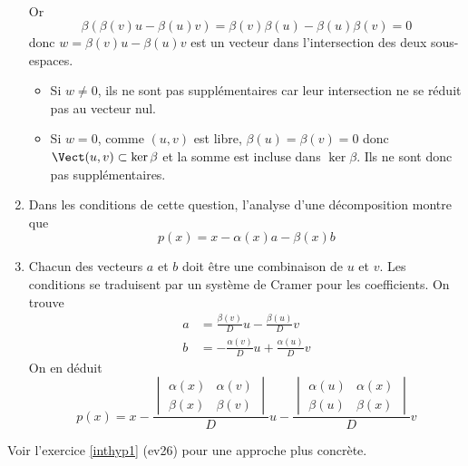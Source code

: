 \begin{enumerate}
\begin{multline*}
\end{multline*}
Or
\begin{displaymath}
  \beta\left( \beta(v)u-\beta(u)v\right) = \beta(v)\beta(u)-\beta(u)\beta(v)=0 
\end{displaymath}
donc $w=\beta(v)u-\beta(u)v$ est un vecteur dans l'intersection des deux sous-espaces.
\begin{itemize}
  \item Si $w\neq 0$, ils ne sont pas supplémentaires car leur intersection ne se réduit pas au vecteur nul.
  \item Si $w=0$, comme $(u,v)$ est libre, $\beta(u)=\beta(v)=0$ donc $\Vect(u,v)\subset \ker \beta$ et la somme est incluse dans $\ker \beta$. Ils ne sont donc pas supplémentaires. 
\end{itemize}

  \item Dans les conditions de cette question, l'analyse d'une décomposition montre que 
\begin{displaymath}
  p(x) = x -\alpha(x)a - \beta(x)b
\end{displaymath}

  \item Chacun des vecteurs $a$ et $b$ doit être une combinaison de $u$ et $v$. Les conditions se traduisent par un système de Cramer pour les coefficients. On trouve
\begin{align*}
  a &= \frac{\beta(v)}{D}u -\frac{\beta(u)}{D} v\\
  b &= -\frac{\alpha(v)}{D}u +\frac{\alpha(u)}{D} v
\end{align*}
On en déduit
\begin{displaymath}
p(x) = x -
\frac{
\begin{vmatrix}
  \alpha(x) & \alpha(v) \\ \beta(x) & \beta(v)
\end{vmatrix}
}{D}u -
\frac{
\begin{vmatrix}
  \alpha(u) & \alpha(x) \\ \beta(u) & \beta(x)
\end{vmatrix}
}{D}v
\end{displaymath}
\end{enumerate}
Voir l'exercice \ref{inthyp1} (ev26) pour une approche plus concrète.